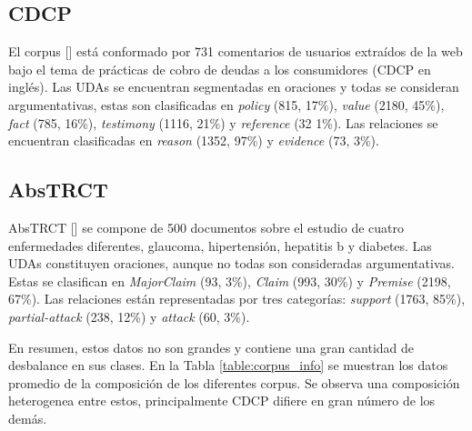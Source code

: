 \subsection{CDCP}\label{corpus:cdcp}

El corpus [\cite{niculae2017argument}] está conformado por 731 comentarios de usuarios extraídos de la web bajo el tema de 
prácticas de cobro de deudas a los consumidores (CDCP en inglés).
Las UDAs se encuentran segmentadas en oraciones y todas se consideran argumentativas, estas son clasificadas en 
\emph{policy} (815, 17\%), \emph{value} (2180, 45\%), \emph{fact} (785, 16\%), \emph{testimony} (1116, 21\%) y \emph{reference} (32 1\%). 
Las relaciones se encuentran clasificadas en \emph{reason} (1352, 97\%) y \emph{evidence} (73, 3\%).

\subsection{AbsTRCT}

AbsTRCT [\cite{mayer2020transformer}] se compone de 500 documentos sobre el estudio de cuatro enfermedades diferentes,
glaucoma, hipertensión, hepatitis b y diabetes. Las UDAs constituyen oraciones, aunque no todas son consideradas
argumentativas. Estas se clasifican en \emph{MajorClaim} (93, 3\%), \emph{Claim} (993, 30\%) y \emph{Premise} (2198, 67\%).
Las relaciones están representadas por tres categorías: \emph{support} (1763, 85\%), \emph{partial-attack} (238, 12\%) y
\emph{attack} (60, 3\%).

En resumen, estos datos no son grandes y contiene una gran cantidad de desbalance en sus clases.
En la Tabla \ref{table:corpus_info} se muestran los datos promedio de la composición de los diferentes corpus. 
Se observa una composición heterogenea entre estos, principalmente CDCP difiere en gran número de los demás.

\begin{table}[h!]
	\begin{center}
	\caption{Información de promedios de los conjuntos de datos.}\label{table:corpus_info}
	\end{center}
\end{table}

